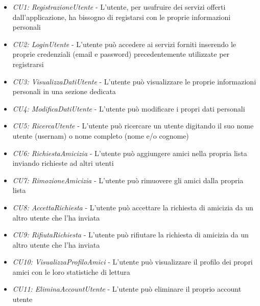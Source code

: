 \documentclass{article}
\begin{document}
\begin{itemize}[label=\textendash]
    \item \textit{CU1: RegistrazioneUtente} - L'utente, per usufruire dei servizi offerti dall'applicazione, ha bissogno di registarsi con le proprie informazioni personali
    \item \textit{CU2: LoginUtente} - L'utente può accedere ai servizi forniti inserendo le proprie credenziali (email e password) precedentemente utilizzate per registrarsi
    \item \textit{CU3: VisualizzaDatiUtente} - L'utente può visualizzare le proprie informazioni personali in una sezione dedicata
    \item \textit{CU4: ModificaDatiUtente} - L'utente può modificare i propri dati personali
    \item \textit{CU5: RicercaUtente} - L'utente può ricercare un utente digitando il suo nome utente (usernam) o nome completo (nome e/o cognome)
    \item \textit{CU6: RichiestaAmicizia} - L'utente può aggiungere amici nella propria lista inviando richieste ad altri utenti
    \item \textit{CU7: RimozioneAmicizia} - L'utente può rimuovere gli amici dalla propria lista
    \item \textit{CU8: AccettaRichiesta} - L'utente può accettare la richiesta di amicizia da un altro utente che l'ha inviata
    \item \textit{CU9: RifiutaRichiesta} - L'utente può rifiutare la richiesta di amicizia da un altro utente che l'ha inviata
    \item \textit{CU10: VisualizzaProfiloAmici} - L'utente può visualizzare il profilo dei propri amici con le loro statistiche di lettura
    \item \textit{CU11: EliminaAccountUtente} - L'utente può eliminare il proprio account utente
\end{itemize}
\end{document}
